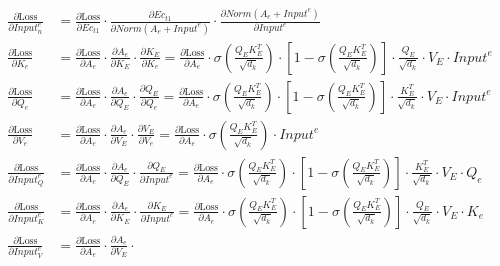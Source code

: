 \documentclass[12pt,letterpaper]{article}
\begin{document}
\begin{align*}
\frac{\partial \text{Loss}}{\partial Input^{e}_n} &= %
\frac{\partial \text{Loss}}{\partial Ec_{t1}} \cdot 
\frac{\partial Ec_{t1}}{\partial Norm(A_{e}+Input^{e})} \cdot 
\frac{\partial Norm(A_{e}+Input^{e})}{\partial Input^{e}} 
\\
\frac{\partial \text{Loss}}{\partial K_{e}} &= %
\frac{\partial \text{Loss}}{\partial A_{e}} \cdot 
\frac{\partial A_{e}}{\partial K_{E}}\cdot
\frac{\partial K_{E}}{\partial K_{e}}=
\frac{\partial \text{Loss}}{\partial A_{e}}\cdot
\sigma\left(\frac{Q_{E} K_{E}^T}{\sqrt{d_k}}\right)\cdot \left[1-\sigma\left(\frac{Q_{E} K_{E}^T}{\sqrt{d_k}}\right)\right]\cdot
\frac{Q_{E}}{\sqrt{d_k}}\cdot V_E \cdot Input^e
\\
\frac{\partial \text{Loss}}{\partial Q_{e}} &= %
\frac{\partial \text{Loss}}{\partial A_{e}} \cdot 
\frac{\partial A_{e}}{\partial Q_{E}}\cdot
\frac{\partial Q_{E}}{\partial Q_{e}}=
\frac{\partial \text{Loss}}{\partial A_{e}}\cdot
\sigma\left(\frac{Q_{E} K_{E}^T}{\sqrt{d_k}}\right)\cdot \left[1-\sigma\left(\frac{Q_{E} K_{E}^T}{\sqrt{d_k}}\right)\right]\cdot
\frac{K_{E}^T}{\sqrt{d_k}}\cdot V_E \cdot Input^e
\\
\frac{\partial \text{Loss}}{\partial V_{e}} &= %
\frac{\partial \text{Loss}}{\partial A_{e}} \cdot 
\frac{\partial A_{e}}{\partial V_{E}}\cdot
\frac{\partial V_{E}}{\partial V_{e}}=
\frac{\partial \text{Loss}}{\partial A_{e}}\cdot
\sigma\left(\frac{Q_{E} K_{E}^T}{\sqrt{d_k}}\right)
\cdot Input^e
\\
\frac{\partial \text{Loss}}{\partial Input^{e}_Q} &= %
\frac{\partial \text{Loss}}{\partial A_{e}} \cdot 
\frac{\partial A_{e}}{\partial Q_{E}}\cdot
\frac{\partial Q_{E}}{\partial Input^{e}}=
\frac{\partial \text{Loss}}{\partial A_{e}}\cdot
\sigma\left(\frac{Q_{E} K_{E}^T}{\sqrt{d_k}}\right)\cdot \left[1-\sigma\left(\frac{Q_{E} K_{E}^T}{\sqrt{d_k}}\right)\right]\cdot
\frac{K_{E}^T}{\sqrt{d_k}}\cdot V_E \cdot Q_e
\\
\frac{\partial \text{Loss}}{\partial Input^{e}_K} &= %
\frac{\partial \text{Loss}}{\partial A_{e}} \cdot 
\frac{\partial A_{e}}{\partial K_{E}}\cdot
\frac{\partial K_{E}}{\partial Input^{e}}=
\frac{\partial \text{Loss}}{\partial A_{e}}\cdot
\sigma\left(\frac{Q_{E} K_{E}^T}{\sqrt{d_k}}\right)\cdot \left[1-\sigma\left(\frac{Q_{E} K_{E}^T}{\sqrt{d_k}}\right)\right]\cdot
\frac{Q_{E}}{\sqrt{d_k}}\cdot V_E \cdot K_e
\\
\frac{\partial \text{Loss}}{\partial Input^{e}_V} &= %
\frac{\partial \text{Loss}}{\partial A_{e}} \cdot 
\frac{\partial A_{e}}{\partial V_{E}}\cdot

\end{align*}
\end{document}
